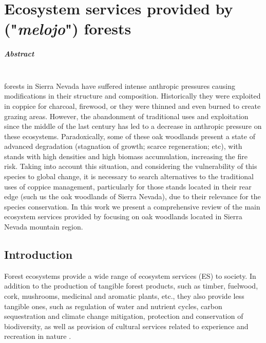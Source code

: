 %
\chapter{\textcolor{ctcolormain}{Ecosystem services provided by \Qpw ("\textit{melojo}") forests}}\label{sec:es}

\mbox{}
\vfill


\newpage

\paragraph{Abstract} \mbox{} \\
\Qp forests in Sierra Nevada have suffered intense anthropic pressures causing modifications in their structure and composition. Historically they were exploited in coppice for charcoal, firewood, or they were thinned and even burned to create grazing areas. However, the abandonment of traditional uses and exploitation since the middle of the last century has led to a decrease in anthropic pressure on these ecosystems. Paradoxically, some of these oak woodlands present a state of advanced degradation (stagnation of growth; scarce regeneration; etc), with stands with high densities and high biomass accumulation, increasing the fire risk. Taking into account this situation, and considering the vulnerability of this species to global change, it is necessary to search alternatives to the traditional uses of coppice management, particularly for those stands located in their rear edge (such us the oak woodlands of Sierra Nevada), due to their relevance for the species conservation. 
In this work we present a comprehensive review of the main ecosystem services provided by \Qpy focusing on oak woodlands located in Sierra Nevada mountain region.
\newpage

\section{Introduction}\label{sec:es:intro}

Forest ecosystems provide a wide range of ecosystem services (ES) to society. In addition to the production of tangible forest products, such as timber, fuelwood, cork, mushrooms, medicinal and aromatic plants, etc., they also provide less tangible ones, such as regulation of water and nutrient cycles, carbon sequestration and climate change mitigation, protection and conservation of biodiversity, as well as provision of cultural services related to experience and recreation in nature \autocite{Acharyaetal2019GlobalTrend,Baetenetal2019IdentifyingTree,deGrootetal2002TypologyClassification,FelipeLuciaetal2018MultipleForest,Gamfeldtetal2013HigherLevels,Iversonetal2018EcosystemServices,Stengeretal2009ValuingEnvironmental}. 

